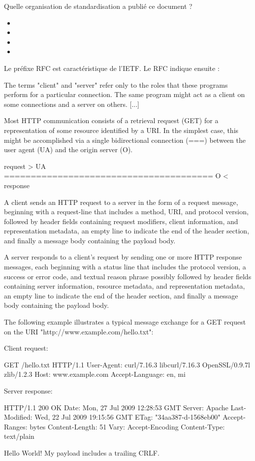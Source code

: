 {
Quelle organisation de standardisation a publié ce document ?

\begin{itemize}[label=$\circ$]
   \item {}
   \item {}
   \item {}
   \item {}
 \end{itemize}
}
{
Le préfixe \acl{RFC} est caractéristique de l'IETF.
}
Le RFC indique ensuite :

\begin{termc} [basicstyle=\footnotesize\ttfamily, frame=singlelabel={lst-rfc7230}]
  The terms "client" and "server" refer only to the roles that these
  programs perform for a particular connection.  The same program might
  act as a client on some connections and a server on others. [...]
 
  Most HTTP communication consists of a retrieval request (GET) for a
  representation of some resource identified by a URI.  In the simplest
  case, this might be accomplished via a single bidirectional
  connection (===) between the user agent (UA) and the origin
  server (O).

           request   >
      UA ======================================= O
                                  <   response

  A client sends an HTTP request to a server in the form of a request
  message, beginning with a request-line that includes a method, URI,
  and protocol version, followed by header fields
  containing request modifiers, client information, and representation
  metadata, an empty line to indicate the end of the
  header section, and finally a message body containing the payload
  body.

  A server responds to a client's request by sending one or more HTTP
  response messages, each beginning with a status line that includes
  the protocol version, a success or error code, and textual reason
  phrase possibly followed by header fields containing
  server information, resource metadata, and representation metadata,
  an empty line to indicate the end of the header
  section, and finally a message body containing the payload body.

  The following example illustrates a typical message exchange for a
  GET request on the URI "http://www.example.com/hello.txt":

  Client request:

    GET /hello.txt HTTP/1.1
    User-Agent: curl/7.16.3 libcurl/7.16.3 OpenSSL/0.9.7l zlib/1.2.3
    Host: www.example.com
    Accept-Language: en, mi

  Server response:

    HTTP/1.1 200 OK
    Date: Mon, 27 Jul 2009 12:28:53 GMT
    Server: Apache
    Last-Modified: Wed, 22 Jul 2009 19:15:56 GMT
    ETag: "34aa387-d-1568eb00"
    Accept-Ranges: bytes
    Content-Length: 51
    Vary: Accept-Encoding
    Content-Type: text/plain

    Hello World! My payload includes a trailing CRLF.
\end{termc}

